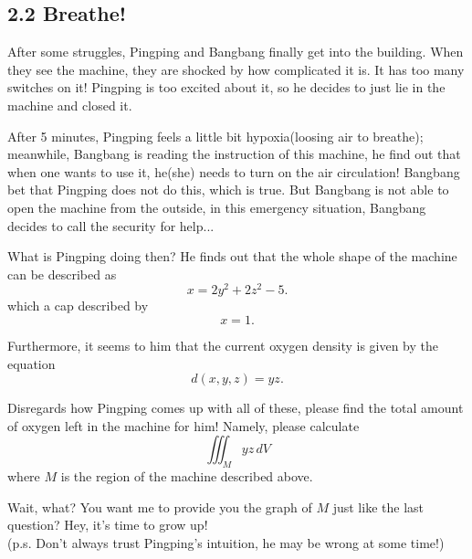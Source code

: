 \documentclass[12pt]{article}
\begin{document}
\subsection*{2.2 Breathe!}
\par After some struggles, Pingping and Bangbang finally get into the building. When they see the machine, they are 
shocked by how complicated it is. It has too many switches on it! Pingping is too excited about it, so he decides to just lie in the machine and closed it. 

\par After 5 minutes, Pingping feels a little bit hypoxia(loosing air to breathe); meanwhile, Bangbang is reading the 
instruction of this machine, he find out that when one wants to use it, he(she) needs to turn on the air 
circulation! Bangbang bet that Pingping does not do this, which is true. But Bangbang is not able to open the machine
from the outside, in this emergency situation, Bangbang decides to call the security for help...

\par What is Pingping doing then? He finds out that the whole shape of the machine can be described as 
\begin{equation*}
    x = 2y^2 + 2z^2 - 5.
\end{equation*}
which a cap described by 
\begin{equation*}
    x = 1.
\end{equation*}
 
\par Furthermore, it seems to him that the current oxygen density is given by the equation 
\begin{equation*}
    d(x,y,z) = yz. 
\end{equation*}

\par Disregards how Pingping comes up with all of these, please find the total amount of oxygen left in the 
machine for him! Namely, please calculate 
\begin{equation*}
    \iiint_M yz\,dV
\end{equation*}
where $M$ is the region of the machine described above. 

\par Wait, what? You want me to provide you the graph of $M$ just like the last question? Hey, it's time to grow 
up! \\
\hfill (p.s. Don't always trust Pingping's intuition, he may be wrong at some time!)
\end{document}
